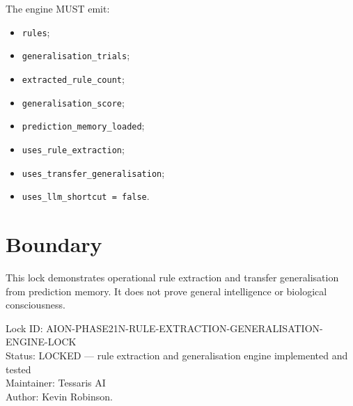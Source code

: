 \documentclass[11pt,a4paper]{article}
\begin{document}
The engine MUST emit:

\begin{itemize}
  \item \texttt{rules};
  \item \texttt{generalisation\_trials};
  \item \texttt{extracted\_rule\_count};
  \item \texttt{generalisation\_score};
  \item \texttt{prediction\_memory\_loaded};
  \item \texttt{uses\_rule\_extraction};
  \item \texttt{uses\_transfer\_generalisation};
  \item \texttt{uses\_llm\_shortcut = false}.
\end{itemize}

\section{Boundary}

This lock demonstrates operational rule extraction and transfer generalisation from prediction memory. It does not prove general intelligence or biological consciousness.

\bigskip

\noindent
Lock ID: AION-PHASE21N-RULE-EXTRACTION-GENERALISATION-ENGINE-LOCK\\
Status: LOCKED --- rule extraction and generalisation engine implemented and tested\\
Maintainer: Tessaris AI\\
Author: Kevin Robinson.
\end{document}
